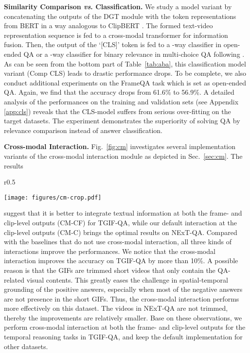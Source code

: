 \documentclass[runningheads]{llncs}
\newcommand{\vs}{\textit{vs}. }
\begin{document}
\textbf{Similarity Comparison \vs Classification.}
We study a model variant by concatenating the outputs of the DGT module with the token representations from BERT in a way analogous to ClipBERT \cite{lei2021less}. The formed text-video representation sequence is fed to a cross-modal transformer for information fusion. Then, the output of the `[CLS]' token is fed to a -way classifier in open-ended QA or a -way classifier for binary relevance in multi-choice QA following \cite{jang2017tgif,le2020hierarchical,xiao2021video}. As can be seen from the bottom part of Table~\ref{tab:aba}, this classification model variant (Comp  CLS) leads to drastic performance drops. To be complete, we also conduct additional experiments on the FrameQA task which is set as open-ended QA. Again, we find that the accuracy drops from 61.6\% to 56.9\%. A detailed analysis of the performances on the training and validation sets (see Appendix \ref{app:cls}) reveals that the CLS-model suffers from serious over-fitting on the target datasets. The experiment demonstrates the superiority of solving QA by relevance comparison instead of answer classification.

\textbf{Cross-modal Interaction.}
Fig.~\ref{fig:cm} investigates several implementation variants of the cross-modal interaction module as depicted in Sec.~\ref{sec:cm}. The results
\begin{wrapfigure}[8]{r}{0.5\textwidth}
 \vspace{-32pt}
  \begin{center}
    \texttt{[image: figures/cm-crop.pdf]}
  \end{center}
   \vspace{-23pt}
  \caption{Study of Cross-modal Interaction.}
  \label{fig:cm}
\end{wrapfigure}
suggest that it is better to integrate textual information at both the frame- and clip-level outputs (CM-CF) for TGIF-QA, while our default interaction at the clip-level outputs (CM-C) brings the optimal results on NExT-QA. 
Compared with the baselines that do not use cross-modal interaction, all three kinds of interactions improve the performances. We notice that the cross-modal interaction improves the accuracy on TGIF-QA by more than 10\%. A possible reason is that the GIFs are trimmed short videos that only contain the QA-related visual contents. This greatly eases the challenge in spatial-temporal grounding of the positive answers, especially when most of the negative answers are not presence in the short GIFs. Thus, the cross-modal interaction performs more effectively on this dataset. The videos in NExT-QA are not trimmed, thereby the improvements are relatively smaller.
Base on these observations, we perform cross-modal interaction at both the frame- and clip-level outputs for the temporal reasoning tasks in TGIF-QA, and keep the default implementation for other datasets.
\end{document}
